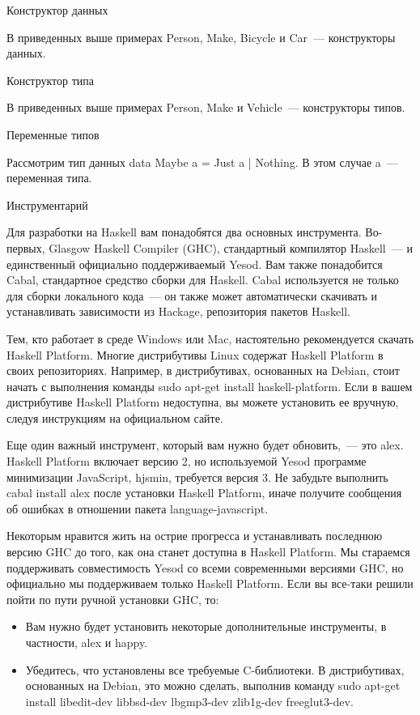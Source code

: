 Конструктор данных

В приведенных выше примерах Person, Make, Bicycle и Car~--- конструкторы данных.

Конструктор типа

В приведенных выше примерах Person, Make и Vehicle~--- конструкторы типов.

Переменные типов

Рассмотрим тип данных data Maybe a = Just a | Nothing. В этом случае a~--- переменная типа.

Инструментарий

Для разработки на Haskell вам понадобятся два основных инструмента. Во-первых, Glasgow Haskell Compiler (GHC), стандартный компилятор Haskell~--- и единственный официально поддерживаемый Yesod. Вам также понадобится Cabal, стандартное средство сборки для Haskell. Cabal используется не только для сборки локального кода~--- он также может автоматически скачивать и устанавливать зависимости из Hackage, репозитория пакетов Haskell.

Тем, кто работает в среде Windows или Mac, настоятельно рекомендуется скачать Haskell Platform. Многие дистрибутивы Linux содержат Haskell Platform в своих репозиториях. Например, в дистрибутивах, основанных на Debian, стоит начать с выполнения команды sudo apt-get install haskell-platform. Если в вашем дистрибутиве Haskell Platform недоступна, вы можете установить ее вручную, следуя инструкциям на официальном сайте.

Еще один важный инструмент, который вам нужно будет обновить,~--- это alex. Haskell Platform включает версию 2, но используемой Yesod программе минимизации JavaScript, hjsmin, требуется версия 3. Не забудьте выполнить cabal install alex после установки Haskell Platform, иначе получите сообщения об ошибках в отношении пакета language-javascript.

Некоторым нравится жить на острие прогресса и устанавливать последнюю версию GHC до того, как она станет доступна в Haskell Platform. Мы стараемся поддерживать совместимость Yesod со всеми современными версиями GHC, но официально мы поддерживаем только Haskell Platform. Если вы все-таки решили пойти по пути ручной установки GHC, то:

\begin{itemize}
  \item Вам нужно будет установить некоторые дополнительные инструменты, в частности, alex и happy.
  \item Убедитесь, что установлены все требуемые C-библиотеки. В дистрибутивах, основанных на Debian, это можно сделать, выполнив команду sudo apt-get install libedit-dev libbsd-dev lbgmp3-dev zlib1g-dev freeglut3-dev.
\end{itemize}


